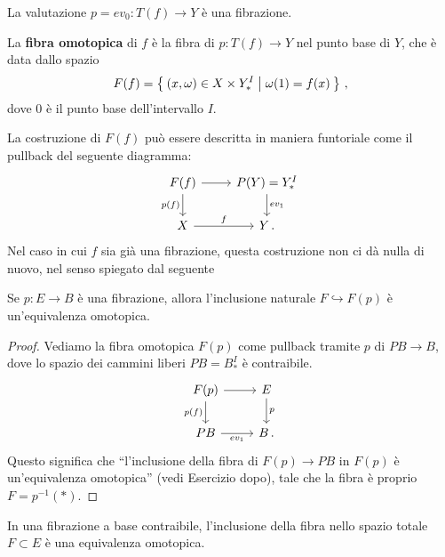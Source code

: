 \begin{exercise}
	La valutazione $p=ev_{0}:T(f) \to Y$ è una fibrazione.
\end{exercise}

\begin{df}
	La \textbf{fibra omotopica} di $f$
	è la fibra di $p:T(f) \to Y$ nel punto base di $Y$,
	che è data dallo spazio
	\begin{equation*}
		F(f) = \Set{(x,\omega) \in X \times Y^{I}_{\ast} | \omega(1) = f(x)}\,,
	\end{equation*}
	dove $0$ è il punto base dell'intervallo $I$.
\end{df}

La costruzione di $F(f)$ può essere descritta in
maniera funtoriale come il pullback del seguente diagramma:
\begin{equation}\label{htpfib-pullback}
	\begin{tikzcd}
		F(f) \ar[r] \ar[d, "p(f)"'] & P(Y) = Y^{I}_{\ast} \ar[d, "ev_{1}"] \\
		X \ar[r, "f"] & Y \,.
	\end{tikzcd}
\end{equation}
Nel caso in cui $f$ sia già una fibrazione,
questa costruzione non ci dà nulla di nuovo,
nel senso spiegato dal seguente

\begin{lemma}
	Se $p:E \to B$ è una fibrazione,
	allora l'inclusione naturale $F \hookrightarrow F(p)$
	è un'equivalenza omotopica.
	\begin{proof}
		Vediamo la fibra omotopica $F(p)$ come pullback
		tramite $p$ di $PB \to B$,
		dove lo spazio dei cammini liberi 
		$PB = B^{I}_{\ast}$ è contraibile.
		\begin{equation*}
			\begin{tikzcd}
			F(p) \ar[r] \ar[d, "p(f)"'] 
			& E \ar[d, "p"] \\
			PB \ar[r, "ev_{1}"'] & B \,.
			\end{tikzcd}
		\end{equation*}
		Questo significa che ``l'inclusione della fibra di $F(p) \to PB$
		in $F(p)$ è un'equivalenza omotopica'' (vedi Esercizio dopo),
		tale che la fibra è proprio $F = p^{-1}(\ast)$.
	\end{proof}
\end{lemma}

\begin{exercise}
	In una fibrazione a base contraibile,
	l'inclusione della fibra nello spazio totale $F \subset E$
	è una equivalenza omotopica.
\end{exercise}


